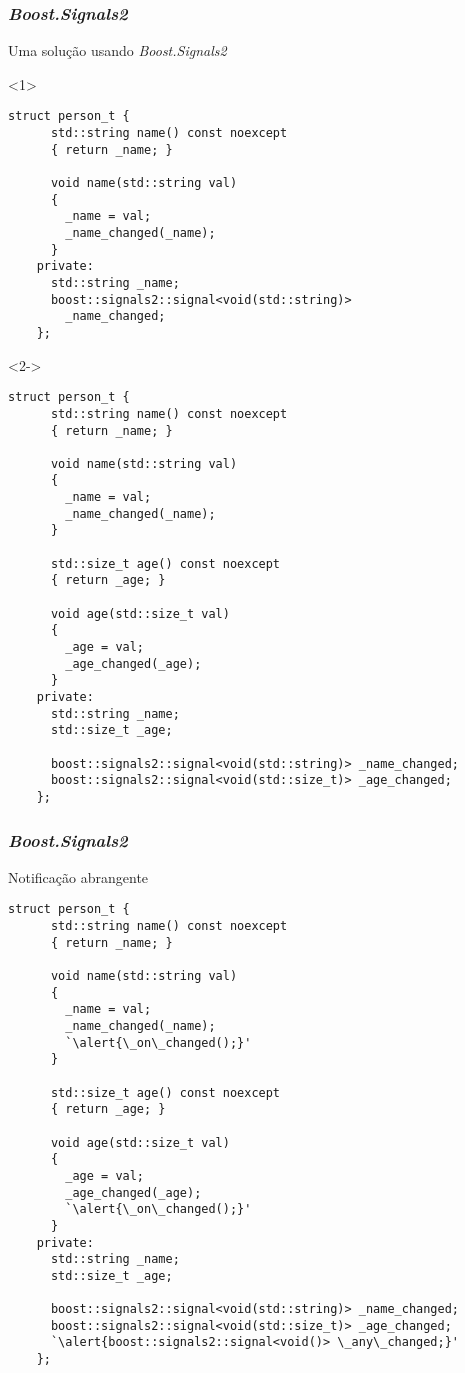 \documentclass[t]{beamer}
\begin{document}
\begin{frame}[fragile]
  \frametitle{\textit{Boost.Signals2}}
  Uma solução usando \textit{Boost.Signals2}

  \begin{onlyenv}<1>
  \begin{lstlisting}[escapeinside=`']
    struct person_t {
      std::string name() const noexcept
      { return _name; }
      
      void name(std::string val)
      {
        _name = val;
        _name_changed(_name);
      }
    private:    
      std::string _name;
      boost::signals2::signal<void(std::string)>
        _name_changed;
    };
  \end{lstlisting}
  \end{onlyenv}

  \begin{onlyenv}<2->
  \begin{lstlisting}[basicstyle=\tiny]
    struct person_t {
      std::string name() const noexcept
      { return _name; }
      
      void name(std::string val)
      {
        _name = val;
        _name_changed(_name);
      }

      std::size_t age() const noexcept
      { return _age; }
      
      void age(std::size_t val)
      {
        _age = val;
        _age_changed(_age);
      }
    private:    
      std::string _name;
      std::size_t _age;

      boost::signals2::signal<void(std::string)> _name_changed;
      boost::signals2::signal<void(std::size_t)> _age_changed;
    };
  \end{lstlisting}
  \end{onlyenv}
\end{frame}

\begin{frame}[fragile]
  \frametitle{\textit{Boost.Signals2}}
  Notificação abrangente

  \begin{lstlisting}[basicstyle=\tiny,escapeinside=`']
    struct person_t {
      std::string name() const noexcept
      { return _name; }
      
      void name(std::string val)
      {
        _name = val;
        _name_changed(_name);
        `\alert{\_on\_changed();}' 
      }

      std::size_t age() const noexcept
      { return _age; }
      
      void age(std::size_t val)
      {
        _age = val;
        _age_changed(_age);
        `\alert{\_on\_changed();}' 
      }
    private:    
      std::string _name;
      std::size_t _age;

      boost::signals2::signal<void(std::string)> _name_changed;
      boost::signals2::signal<void(std::size_t)> _age_changed;
      `\alert{boost::signals2::signal<void()> \_any\_changed;}'
    };
  \end{lstlisting}
\end{frame}
\end{document}
